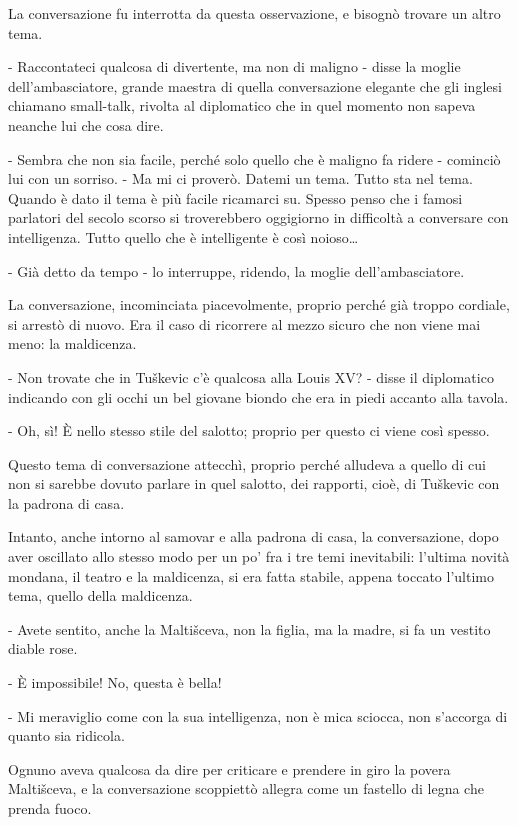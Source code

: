 La conversazione fu interrotta da questa osservazione, e bisognò trovare un altro tema. 

- Raccontateci qualcosa di divertente, ma non di maligno - disse la moglie dell'ambasciatore, grande maestra di quella conversazione elegante che gli inglesi chiamano small-talk, rivolta al diplomatico che in quel momento non sapeva neanche lui che cosa dire. 

- Sembra che non sia facile, perché solo quello che è maligno fa ridere - cominciò lui con un sorriso. - Ma mi ci proverò. Datemi un tema. Tutto sta nel tema. Quando è dato il tema è più facile ricamarci su. Spesso penso che i famosi parlatori del secolo scorso si troverebbero oggigiorno in difficoltà a conversare con intelligenza. Tutto quello che è intelligente è così noioso\ldots{} 

- Già detto da tempo - lo interruppe, ridendo, la moglie dell'ambasciatore. 

La conversazione, incominciata piacevolmente, proprio perché già troppo cordiale, si arrestò di nuovo. Era il caso di ricorrere al mezzo sicuro che non viene mai meno: la maldicenza. 

- Non trovate che in Tuškevic c'è qualcosa alla Louis XV? - disse il diplomatico indicando con gli occhi un bel giovane biondo che era in piedi accanto alla tavola. 

- Oh, sì! È nello stesso stile del salotto; proprio per questo ci viene così spesso. 

Questo tema di conversazione attecchì, proprio perché alludeva a quello di cui non si sarebbe dovuto parlare in quel salotto, dei rapporti, cioè, di Tuškevic con la padrona di casa. 

Intanto, anche intorno al samovar e alla padrona di casa, la conversazione, dopo aver oscillato allo stesso modo per un po' fra i tre temi inevitabili: l'ultima novità mondana, il teatro e la maldicenza, si era fatta stabile, appena toccato l'ultimo tema, quello della maldicenza. 

- Avete sentito, anche la Maltišceva, non la figlia, ma la madre, si fa un vestito diable rose. 

- È impossibile! No, questa è bella! 

- Mi meraviglio come con la sua intelligenza, non è mica sciocca, non s'accorga di quanto sia ridicola. 

Ognuno aveva qualcosa da dire per criticare e prendere in giro la povera Maltišceva, e la conversazione scoppiettò allegra come un fastello di legna che prenda fuoco. 

